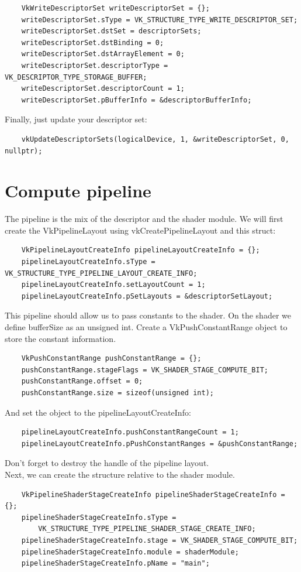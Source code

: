 \documentclass{article}
\begin{document}
\begin{lstlisting}
	VkWriteDescriptorSet writeDescriptorSet = {};
	writeDescriptorSet.sType = VK_STRUCTURE_TYPE_WRITE_DESCRIPTOR_SET;
	writeDescriptorSet.dstSet = descriptorSets;
	writeDescriptorSet.dstBinding = 0;
	writeDescriptorSet.dstArrayElement = 0;
	writeDescriptorSet.descriptorType = VK_DESCRIPTOR_TYPE_STORAGE_BUFFER;
	writeDescriptorSet.descriptorCount = 1;
	writeDescriptorSet.pBufferInfo = &descriptorBufferInfo;
\end{lstlisting}
Finally, just update your descriptor set:
\begin{lstlisting}
	vkUpdateDescriptorSets(logicalDevice, 1, &writeDescriptorSet, 0, nullptr);
\end{lstlisting}

\section{Compute pipeline}
The pipeline is the mix of the descriptor and the shader module. We will first create the VkPipelineLayout using vkCreatePipelineLayout and this struct:
\begin{lstlisting}
	VkPipelineLayoutCreateInfo pipelineLayoutCreateInfo = {};
	pipelineLayoutCreateInfo.sType = VK_STRUCTURE_TYPE_PIPELINE_LAYOUT_CREATE_INFO;
	pipelineLayoutCreateInfo.setLayoutCount = 1;
	pipelineLayoutCreateInfo.pSetLayouts = &descriptorSetLayout;
\end{lstlisting}
This pipeline should allow us to pass constants to the shader. On the shader we define bufferSize as an unsigned int. Create a VkPushConstantRange object to store the constant information.
\begin{lstlisting}
	VkPushConstantRange pushConstantRange = {};
	pushConstantRange.stageFlags = VK_SHADER_STAGE_COMPUTE_BIT;
	pushConstantRange.offset = 0;
	pushConstantRange.size = sizeof(unsigned int);
\end{lstlisting}
And set the object to the pipelineLayoutCreateInfo:
\begin{lstlisting}
	pipelineLayoutCreateInfo.pushConstantRangeCount = 1;
	pipelineLayoutCreateInfo.pPushConstantRanges = &pushConstantRange;
\end{lstlisting}
Don't forget to destroy the handle of the pipeline layout.\\
Next, we can create the structure relative to the shader module.
\begin{lstlisting}
	VkPipelineShaderStageCreateInfo pipelineShaderStageCreateInfo = {};
	pipelineShaderStageCreateInfo.sType =
		VK_STRUCTURE_TYPE_PIPELINE_SHADER_STAGE_CREATE_INFO;
	pipelineShaderStageCreateInfo.stage = VK_SHADER_STAGE_COMPUTE_BIT;
	pipelineShaderStageCreateInfo.module = shaderModule;
	pipelineShaderStageCreateInfo.pName = "main";
\end{lstlisting}
\end{document}

